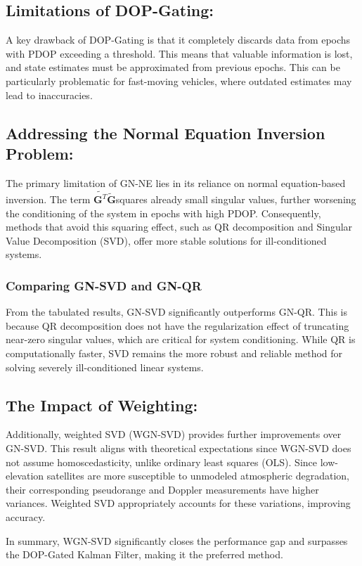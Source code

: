 \documentclass[conference]{IEEEtran}
\begin{document}
\subsection{Limitations of DOP-Gating:}
A key drawback of DOP-Gating is that it completely discards data from epochs with PDOP exceeding a threshold. This means that valuable information is lost, and state estimates must be approximated from previous epochs. This can be particularly problematic for fast-moving vehicles, where outdated estimates may lead to inaccuracies.

\subsection{Addressing the Normal Equation Inversion Problem:}
The primary limitation of GN-NE lies in its reliance on normal equation-based inversion. The term $\tilde{\mathbf{G}^T} \tilde{\mathbf{G}}$squares already small singular values, further worsening the conditioning of the system in epochs with high PDOP. Consequently, methods that avoid this squaring effect, such as QR decomposition and Singular Value Decomposition (SVD), offer more stable solutions for ill-conditioned systems.

\subsubsection{Comparing GN-SVD and GN-QR}
From the tabulated results, GN-SVD significantly outperforms GN-QR. This is because QR decomposition does not have the regularization effect of truncating near-zero singular values, which are critical for system conditioning. While QR is computationally faster, SVD remains the more robust and reliable method for solving severely ill-conditioned linear systems.

\subsection{The Impact of Weighting:}
Additionally, weighted SVD (WGN-SVD) provides further improvements over GN-SVD. This result aligns with theoretical expectations since WGN-SVD does not assume homoscedasticity, unlike ordinary least squares (OLS). Since low-elevation satellites are more susceptible to unmodeled atmospheric degradation, their corresponding pseudorange and Doppler measurements have higher variances. Weighted SVD appropriately accounts for these variations, improving accuracy.

In summary, WGN-SVD significantly closes the performance gap and surpasses the DOP-Gated Kalman Filter, making it the preferred method.
\end{document}
